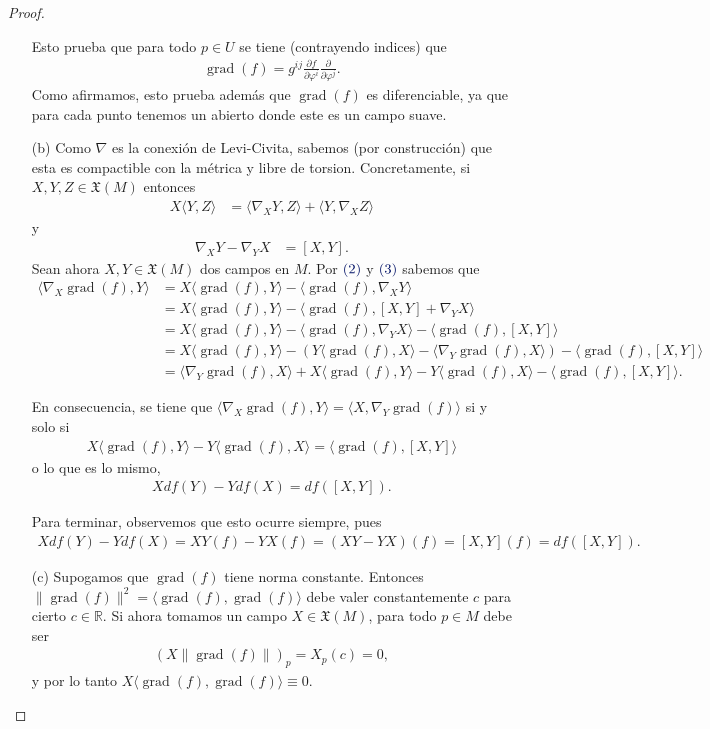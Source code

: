 \documentclass[11pt]{article}
\newcommand{\R}{\mathbb{R}}
\newcommand{\X}{\mathfrak{X}}
\newcommand{\grad}{\operatorname{grad}}
\newcommand{\ip}[1]{\langle #1 \rangle}
\newcommand{\gancho}[1]{\frac{\partial}{\partial \varphi^{#1}}}
\newcommand{\paint}[1]{\color{color}{#1}}
\begin{document}
\begin{proof}
\begin{itemize}[listparindent = \parindent]
Esto prueba que para todo $p \in U$ se tiene (contrayendo indices) que
\begin{align*}
\grad(f) = g^{ij}\frac{\partial f}{\partial \varphi^i}\gancho{j}.
\end{align*}
Como afirmamos, esto prueba además que $\grad(f)$ es diferenciable, ya que para cada punto tenemos un abierto donde este es un campo suave.
\item[(b)] Como $\nabla$ es la conexión de Levi-Civita, sabemos (por construcción) que esta es compactible con la métrica y libre de torsion. Concretamente, si $X,Y,Z \in \X(M)$ entonces
\begin{align}
X\ip{Y,Z} &= \ip{\nabla_XY,Z} + \ip{Y,\nabla_XZ}
\end{align}
y
\begin{align}
\nabla_XY - \nabla_YX &= [X,Y].
\end{align}
Sean ahora $X,Y \in \X(M)$ dos campos en $M$. Por $\paint{(2)}$ y $\paint{(3)}$ sabemos que
\begin{align*}
\ip{\nabla_X\grad(f),Y} &= X\ip{\grad(f),Y}-\ip{\grad(f),\nabla_XY}\\
&= X\ip{\grad(f),Y} - \ip{\grad(f),[X,Y]+\nabla_YX}\\
&= X\ip{\grad(f),Y} - \ip{\grad(f),\nabla_YX} - \ip{\grad(f),[X,Y]}\\
&= X\ip{\grad(f),Y} - (Y\ip{\grad(f),X}-\ip{\nabla_Y\grad(f),X}) - \ip{\grad(f),[X,Y]}\\
&= \ip{\nabla_Y\grad(f),X} + X\ip{\grad(f),Y} - Y\ip{\grad(f),X} - \ip{\grad(f),[X,Y]}.
\end{align*} 

En consecuencia, se tiene que $\ip{\nabla_X\grad(f),Y} = \ip{X,\nabla_Y\grad(f)}$ si y solo si
\begin{align*}
X\ip{\grad(f),Y} - Y\ip{\grad(f),X} = \ip{\grad(f),[X,Y]}
\end{align*}
o lo que es lo mismo,
\begin{align*}
Xdf(Y) - Ydf(X) = df([X,Y]).
\end{align*}

Para terminar, observemos que esto ocurre siempre, pues
\begin{align*}
Xdf(Y) - Ydf(X) = XY(f) - YX(f) = (XY-YX)(f) = [X,Y](f) = df([X,Y]).
\end{align*}
\item[(c)] Supogamos que $\grad(f)$ tiene norma constante. Entonces $\|\grad(f)\|^2 = \ip{\grad(f),\grad(f)}$ debe valer constantemente $c$ para cierto $c \in \R$. Si ahora tomamos un campo $X \in \X(M)$, para todo $p \in M$ debe ser
\begin{align*}
(X\|\grad(f)\|)_p = X_p(c) = 0,
\end{align*}
y por lo tanto $X \ip{\grad(f),\grad(f)} \equiv 0$. 


\end{itemize}
\end{proof}
\end{document}
